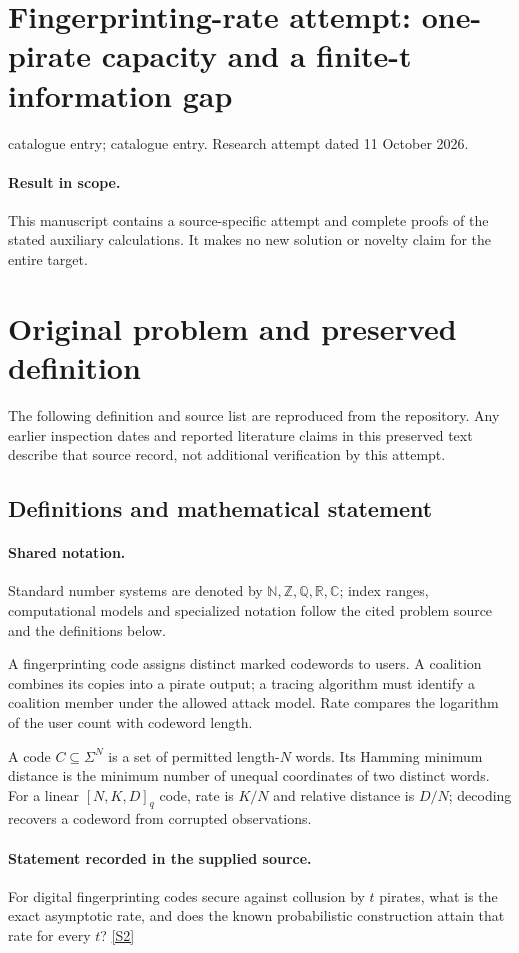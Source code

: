 \documentclass[11pt]{article}
\begin{document}
\section*{Fingerprinting-rate attempt: one-pirate capacity and a finite-t information gap}
\noindent catalogue entry; catalogue entry. Research attempt dated 11 October 2026.
\paragraph{Result in scope.}This manuscript contains a source-specific attempt and complete proofs of the stated auxiliary calculations. It makes no new solution or novelty claim for the entire target.
\section{Original problem and preserved definition}
The following definition and source list are reproduced from the repository. Any earlier inspection dates and reported literature claims in this preserved text describe that source record, not additional verification by this attempt.
\subsection{Definitions and mathematical statement}

\paragraph{Shared notation.}Standard number systems are denoted by $\mathbb N,\mathbb Z,\mathbb Q,\mathbb R,\mathbb C$; index ranges, computational models and specialized notation follow the cited problem source and the definitions below.


A fingerprinting code assigns distinct marked codewords to users. A coalition combines its copies into a pirate output; a tracing algorithm must identify a coalition member under the allowed attack model. Rate compares the logarithm of the user count with codeword length.

A code $C\subseteq\Sigma^N$ is a set of permitted length-$N$ words. Its Hamming minimum distance is the minimum number of unequal coordinates of two distinct words. For a linear $[N,K,D]_q$ code, rate is $K/N$ and relative distance is $D/N$; decoding recovers a codeword from corrupted observations.
\paragraph{Statement recorded in the supplied source.}
For digital fingerprinting codes secure against collusion by $t$ pirates, what is the exact asymptotic rate, and does the known probabilistic construction attain that rate for every $t$? \href{https://doi.org/10.4171/owr/2008/01}{[S2]}
\end{document}
